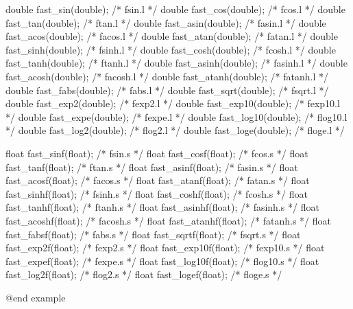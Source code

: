  double fast_sin(double);	/*	fsin.l */
 double fast_cos(double);	/*	fcos.l */
 double fast_tan(double);	/*	ftan.l */
 double fast_asin(double);	/*	fasin.l */
 double fast_acos(double);	/*	facos.l */
 double fast_atan(double);	/*	fatan.l */
 double fast_sinh(double);	/*	fsinh.l */
 double fast_cosh(double);	/*	fcosh.l */
 double fast_tanh(double);	/*	ftanh.l */
 double fast_asinh(double);	/*	fasinh.l */
 double fast_acosh(double);	/*	facosh.l */
 double fast_atanh(double);	/*	fatanh.l */
 double fast_fabs(double);	/*	fabs.l */
 double fast_sqrt(double);	/*	fsqrt.l */
 double fast_exp2(double);	/*	fexp2.l */
 double fast_exp10(double);	/*	fexp10.l */
 double fast_expe(double);	/*	fexpe.l */
 double fast_log10(double);	/*	flog10.l */
 double fast_log2(double);	/*	flog2.l */
 double fast_loge(double);	/*	floge.l */

 float fast_sinf(float);	/*	fsin.s */
 float fast_cosf(float);	/*	fcos.s */
 float fast_tanf(float);	/*	ftan.s */
 float fast_asinf(float);	/*	fasin.s */
 float fast_acosf(float);	/*	facos.s */
 float fast_atanf(float);	/*	fatan.s */
 float fast_sinhf(float);	/*	fsinh.s */
 float fast_coshf(float);	/*	fcosh.s */
 float fast_tanhf(float);	/*	ftanh.s */
 float fast_asinhf(float);	/*	fasinh.s */
 float fast_acoshf(float);	/*	facosh.s */
 float fast_atanhf(float);	/*	fatanh.s */
 float fast_fabsf(float);	/*	fabs.s */
 float fast_sqrtf(float);	/*	fsqrt.s */
 float fast_exp2f(float);	/*	fexp2.s */
 float fast_exp10f(float);	/*	fexp10.s */
 float fast_expef(float);	/*	fexpe.s */
 float fast_log10f(float);	/*	flog10.s */
 float fast_log2f(float);	/*	flog2.s */
 float fast_logef(float);	/*	floge.s */

@end example


